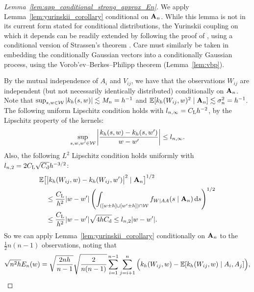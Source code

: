 \begin{proof}[Lemma~\ref{lem:app_conditional_strong_approx_En}]

  We apply Lemma~\ref{lem:yurinskii_corollary} conditional on
  $\mathbf{A}_n$. While this lemma is not in its current form
  stated for conditional distributions,
  the Yurinskii coupling on which it depends can be readily extended
  by following the proof of \citet[Lemma~38]{belloni2019conditional},
  using a conditional version of Strassen's theorem
  \cite[Theorem~B.2]{chen2020jackknife}.
  Care must similarly be taken in embedding the conditionally Gaussian vectors
  into a conditionally Gaussian process, using the
  Vorob'ev--Berkes--Philipp theorem (Lemma~\ref{lem:vbp}).

  By the mutual independence of $A_i$ and $V_{i j}$,
  we have that the observations
  $W_{i j}$ are independent
  (but not necessarily identically distributed)
  conditionally on $\mathbf{A}_n$.
  Note that
  $\sup_{s,w \in \mathcal{W}} |k_h(s,w)| \lesssim M_n = h^{-1}$
  and
  $\mathbb{E}[k_h(W_{i j},w)^2 \mid \mathbf{A}_n] \lesssim \sigma_n^2 = h^{-1}$.
  The following uniform Lipschitz condition holds
  with $l_{n,\infty} = C_\mathrm{L} h^{-2}$,
  by the Lipschitz property of the kernels:
  \begin{align*}
    \sup_{s,w,w' \in \mathcal{W}}
    \left|
    \frac{k_h(s, w) - k_h(s, w')}
    {w-w'}
    \right|
    \leq
    l_{n,\infty}.
  \end{align*}
  Also, the following $L^2$ Lipschitz condition holds
  uniformly with $l_{n,2} = 2 C_\mathrm{L} \sqrt{C_\mathrm{d}} h^{-3/2}$:
  \begin{align*}
    &\mathbb{E}\big[
      \big|
      k_h(W_{i j}, w) - k_h(W_{i j}, w')
      \big|^2
      \mid \mathbf{A}_n
    \big]^{1/2} \\
    &\quad\leq
    \frac{C_\mathrm{L}}{h^2}
    |w-w'|
    \left(
      \int_{([w \pm h] \cup [w' \pm h]) \cap \mathcal{W}}
      f_{W \mid AA}(s \mid  \mathbf{A}_n)
      \,\mathrm{d}s
    \right)^{1/2} \\
    &\quad\leq
    \frac{C_\mathrm{L}}{h^2}
    |w-w'|
    \sqrt{4h C_\mathrm{d}}
    \leq
    l_{n,2}
    |w-w'|.
  \end{align*}
  So we can apply
  Lemma~\ref{lem:yurinskii_corollary}
  conditionally on $\mathbf{A}_n$
  to the $\frac{1}{2}n(n-1)$ observations,
  noting that
  \begin{align*}
    \sqrt{n^2h} E_n(w)
    =
    \sqrt{\frac{2 n h}{n-1}}
    \sqrt{\frac{2}{n(n-1)}}
    \sum_{i=1}^{n-1}
    \sum_{j=i+1}^{n}
    \Big(
      k_h(W_{i j},w)
      - \mathbb{E}[k_h(W_{i j},w)  \mid  A_i, A_j]
    \Big),
  \end{align*}

\end{proof}

